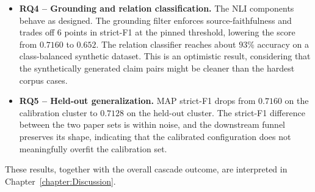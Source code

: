 \begin{itemize}[label={},leftmargin=1.5em]
    \item \textbf{RQ4 -- Grounding and relation classification.} The NLI components behave as designed. The grounding filter enforces source-faithfulness and trades off 6 points in strict-F1 at the pinned threshold, lowering the score from $0.7160$ to $0.652$. The relation classifier reaches about $93\%$ accuracy on a class-balanced synthetic dataset. This is an optimistic result, considering that the synthetically generated claim pairs might be cleaner than the hardest corpus cases. 
    
    \item \textbf{RQ5 -- Held-out generalization.} MAP strict-F1 drops from $0.7160$ on the calibration cluster to $0.7128$ on the held-out cluster. The strict-F1 difference between the two paper sets is within noise, and the downstream funnel preserves its shape, indicating that the calibrated configuration does not meaningfully overfit the calibration set.

\end{itemize}

These results, together with the overall cascade outcome, are interpreted in Chapter~\ref{chapter:Discussion}.